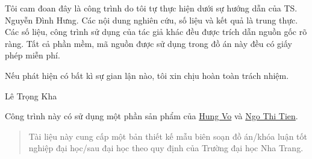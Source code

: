

\thesislayout


\coverpage

\frontmatter

\begin{declaration}

Tôi cam đoan đây là công trình do tôi tự thực hiện dưới sự hướng dẫn của TS. Nguyễn Đình Hưng. Các nội dung nghiên cứu, số liệu và kết quả là trung thực. Các số liệu, công trình sử dụng của tác giả khác đều được trích dẫn nguồn gốc rõ ràng. Tất cả phần mềm, mã nguồn được sử dụng trong đồ án này đều có giấy phép miễn phí. 

Nếu phát hiện có bất kì sự gian lận nào, tôi xin chịu hoàn toàn trách nhiệm.


\begin{flushright}
        {Lê Trọng Kha}
\end{flushright}
\end{declaration}

\newpage

\begin{acknowledgments}
Công trình này có sử dụng một phần sản phẩm của \href{https://github.com/thanhhungqb/thesis-template}{Hung Vo} và \href{https://www.overleaf.com/project/62986f62b65db6f03abab3b8}{Ngo Thi Tien}. 


\end{acknowledgments}

\begin{abstract}
Tài liệu này cung cấp một bản thiết kế mẫu biên soạn đồ án/khóa luận tốt nghiệp đại học/sau đại học theo quy định của Trường đại học Nha Trang.
\end{abstract}	

\tableofcontents
\listoftables
\listoffigures
\listofalgorithms

\mainmatter
\fancyhead{}  %
\renewcommand{\footrulewidth}{0.4pt}
\pagestyle{fancy} 
\renewcommand{\chaptermark}[1]{\markboth{#1}{#1}}
\fancyhead[R]{\chaptername\ \thechapter\ --\ \leftmark}





 


